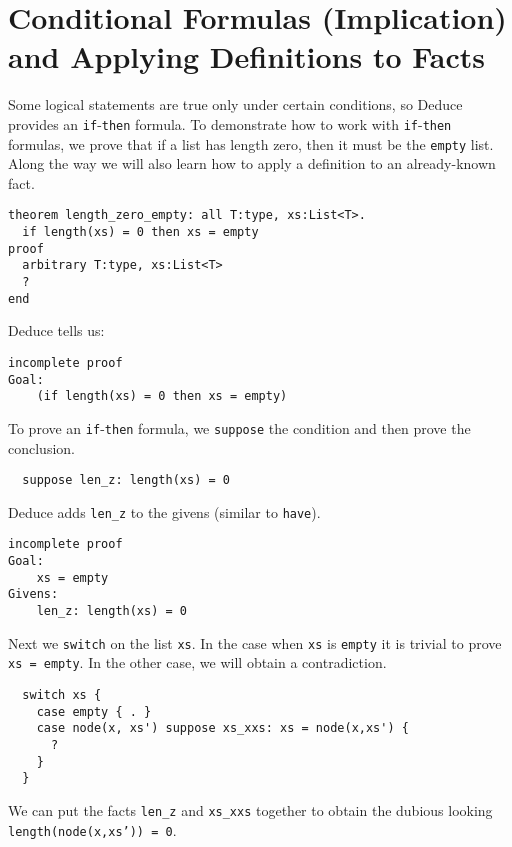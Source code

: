 \documentclass[12pt]{article}
\begin{document}
\section{Conditional Formulas (Implication) and Applying Definitions to Facts}
\label{sec:implication}

Some logical statements are true only under certain conditions, so
Deduce provides an \texttt{if}-\texttt{then} formula.  To demonstrate
how to work with \texttt{if}-\texttt{then} formulas, we prove that if
a list has length zero, then it must be the \texttt{empty} list. Along
the way we will also learn how to apply a definition to an
already-known fact.

\begin{verbatim}
theorem length_zero_empty: all T:type, xs:List<T>.
  if length(xs) = 0 then xs = empty
proof
  arbitrary T:type, xs:List<T>
  ?
end
\end{verbatim}

\noindent Deduce tells us:

\begin{verbatim}
incomplete proof
Goal:
    (if length(xs) = 0 then xs = empty)
\end{verbatim}

To prove an \texttt{if}-\texttt{then} formula, we \texttt{suppose} the
condition and then prove the conclusion.

\begin{verbatim}
  suppose len_z: length(xs) = 0
\end{verbatim}

Deduce adds \texttt{len\_z} to the givens (similar to \texttt{have}).

\begin{verbatim}
incomplete proof
Goal:
    xs = empty
Givens:
    len_z: length(xs) = 0
\end{verbatim}

Next we \texttt{switch} on the list \texttt{xs}. In the case when
\texttt{xs} is \texttt{empty} it is trivial to prove \texttt{xs = empty}.
In the other case, we will obtain a contradiction.

\begin{verbatim}
  switch xs {
    case empty { . }
    case node(x, xs') suppose xs_xxs: xs = node(x,xs') {
      ?
    }
  }
\end{verbatim}

We can put the facts \texttt{len\_z} and \texttt{xs\_xxs} together
to obtain the dubious looking \texttt{length(node(x,xs')) = 0}.
\end{document}
